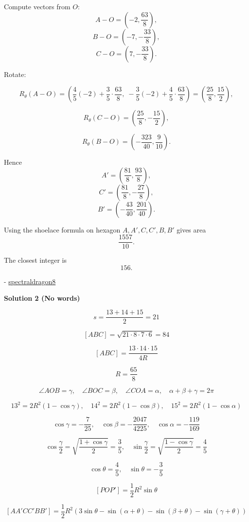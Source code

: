 \begin{enumerate}
 Compute vectors from $O$:
 \[A - O = \left(-2,\frac{63}{8}\right),\]
 \[B - O = \left(-7,-\frac{33}{8}\right),\]
 \[C - O = \left(7,-\frac{33}{8}\right).\]

 Rotate:

 
 \[R_\theta(A - O) = \left( \frac{4}{5}(-2) + \frac{3}{5}\cdot\frac{63}{8},\; -\frac{3}{5}(-2) + \frac{4}{5}\cdot\frac{63}{8} \right) = \left(\frac{25}{8},\frac{15}{2}\right),\]

 \[R_\theta(C - O) = \left(\frac{25}{8},-\frac{15}{2}\right),\]

 \[R_\theta(B - O) = \left(-\frac{323}{40},\frac{9}{10}\right).\]

 Hence
 \[A' = \left(\frac{81}{8},\frac{93}{8}\right),\]
 \[C' = \left(\frac{81}{8},-\frac{27}{8}\right),\]
 \[B' = \left(-\frac{43}{40},\frac{201}{40}\right).\]

 Using the shoelace formula on hexagon $A,A',C,C',B,B'$ gives area
 \[\frac{1557}{10}.\]

 The closest integer is
 \[\boxed{156}.\]

 - \href{https://artofproblemsolving.com/wiki/index.php/User:Spectraldragon8}{spectraldragon8}

 



\textbf{Solution 2 (No words)}


 \[s=\frac{13+14+15}{2}=21\]

 \[[ABC]=\sqrt{21\cdot8\cdot7\cdot6}=84\]

 \[[ABC]=\frac{13\cdot14\cdot15}{4R}\]

 \[R=\frac{65}{8}\]

 \[\angle AOB=\gamma,\quad \angle BOC=\beta,\quad \angle COA=\alpha,\quad \alpha+\beta+\gamma=2\pi\]

 \[13^2=2R^2(1-\cos\gamma),\quad 14^2=2R^2(1-\cos\beta),\quad 15^2=2R^2(1-\cos\alpha)\]

 \[\cos\gamma=-\frac{7}{25},\quad \cos\beta=-\frac{2047}{4225},\quad \cos\alpha=-\frac{119}{169}\]

 \[\cos\frac{\gamma}{2}=\sqrt{\frac{1+\cos\gamma}{2}}=\frac{3}{5},\quad \sin\frac{\gamma}{2}=\sqrt{\frac{1-\cos\gamma}{2}}=\frac{4}{5}\]

 \[\cos\theta=\frac{4}{5},\quad \sin\theta=-\frac{3}{5}\]

 \[[POP']=\frac12R^2\sin\theta\]

 \[[AA'CC'BB'] =\frac12R^2\left( 3\sin\theta-\sin(\alpha+\theta)-\sin(\beta+\theta)-\sin(\gamma+\theta) \right)\]


\end{enumerate}
